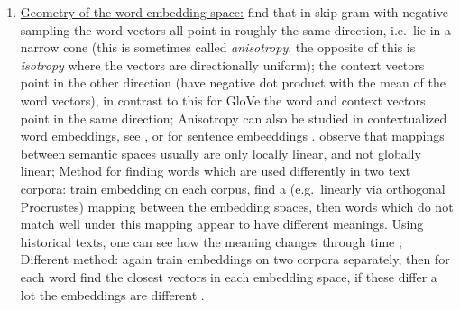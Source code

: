 \documentclass[11pt, a4paper]{amsart}
\begin{document}
\begin{enumerate}[resume]
    \item \underline{Geometry of the word embedding space:}
    \newline
    \cite{mimno-thompson-2017-strange} find that in skip-gram with negative sampling the word vectors all point in roughly the same direction, i.e.\ lie in a narrow cone (this is sometimes called \emph{anisotropy}, the opposite of this is \emph{isotropy} where the vectors are directionally uniform);
    the context vectors point in the other direction (have negative dot product with the mean of the word vectors),
    in contrast to this for GloVe the word and context vectors point in the same direction;
    \newline
    Anisotropy can also be studied in contextualized word embeddings, see \cite{ethayarajh-2019-contextual}, or for sentence embeeddings \cite{li-etal-2020-sentence}.
    \newline
    \cite{nakashole-flauger-2018-characterizing} observe that mappings between semantic spaces usually are only locally linear, and not globally linear;
    \newline
    Method for finding words which are used differently in two text corpora:
    train embedding on each corpus, find a (e.g.\ linearly via orthogonal Procrustes) mapping between the embedding spaces, then words which do not match well under this mapping appear to have different meanings.
    Using historical texts, one can see how the meaning changes through time \cite{hamilton-etal-2016-diachronic};
    \newline
    Different method:
    again train embeddings on two corpora separately, then for each word find the closest vectors in each embedding space, if these differ a lot the embeddings are different \cite{gonen-etal-2020-simple}.
    

\end{enumerate}
\end{document}
